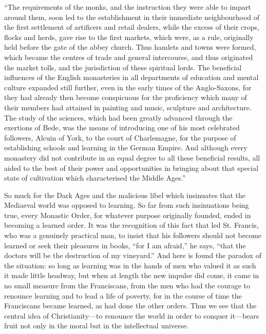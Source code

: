 \documentclass{book}
\begin{document}
“The requirements of the monks, and the instruction they were able to impart around them, soon led to the establishment in their immediate neighbourhood of the first settlement of artificers and retail dealers, while the excess of their crops, flocks and herds, gave rise to the first markets, which were, as a rule, originally held before the gate of the abbey church. Thus hamlets and towns were formed, which became the centres of trade and general intercourse, and thus originated the market tolls, and the jurisdiction of these spiritual lords. The beneficial influences of the English monasteries in all departments of education and mental culture expanded still further, even in the early times of the Anglo-Saxons, for they had already then become conspicuous for the proficiency which many of their members had attained in painting and music, sculpture and architecture. The study of the sciences, which had been greatly advanced through the exertions of Bede, was the means of introducing one of his most celebrated followers, Alcuin of York, to the court of Charlemagne, for the purpose of establishing schools and learning in the German Empire. And although every monastery did not contribute in an equal degree to all these beneficial results, all aided to the best of their power and opportunities in bringing about that special state of cultivation which characterised the Middle Ages.”\footnotemark[7]

So much for the Dark Ages and the malicious libel which insinuates that the Mediaeval world was opposed to learning. So far from such insinuations being true, every Monastic Order, for whatever purpose originally founded, ended in becoming a learned order. It was the recognition of this fact that led St. Francis, who was a genuinely practical man, to insist that his followers should not become learned or seek their pleasures in books, “for I am afraid,” he says, “that the doctors will be the destruction of my vineyard.” And here is found the paradox of the situation: so long as learning was in the hands of men who valued it as such it made little headway, but when at length the new impulse did come, it came in no small measure from the Franciscans, from the men who had the courage to renounce learning and to lead a life of poverty, for in the course of time the Franciscans became learned, as had done the other orders. Thus we see that the central idea of Christianity—to renounce the world in order to conquer it—bears fruit not only in the moral but in the intellectual universe.
\end{document}
